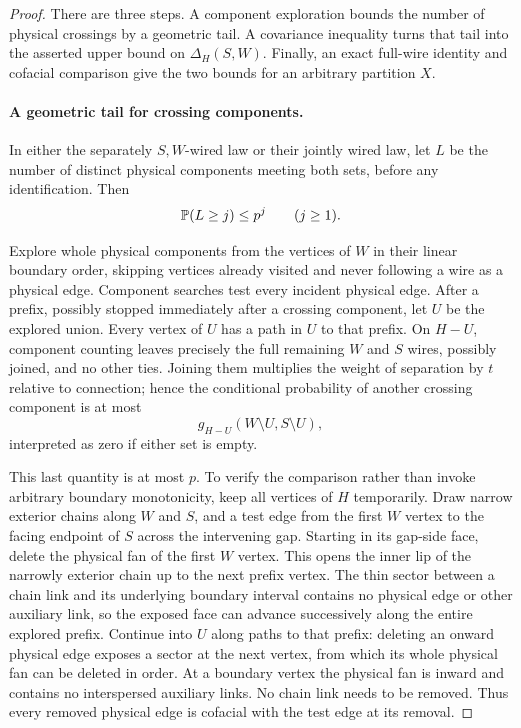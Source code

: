 \begin{proof}
There are three steps. A component exploration bounds the number of
physical crossings by a geometric tail. A covariance inequality turns
that tail into the asserted upper bound on $\Delta_H(S,W)$. Finally,
an exact full-wire identity and cofacial comparison give the two bounds
for an arbitrary partition $X$.

\paragraph{A geometric tail for crossing components.}
In either the separately
$S,W$-wired law or their jointly wired law, let $L$ be the number of
distinct physical components meeting both sets, before any identification.
Then
\begin{equation}
 \mathbb P(L\ge j)\le p^j\qquad(j\ge1).
 \label{rect:component-tail}
\end{equation}

Explore whole physical components from the vertices of $W$ in their
linear boundary order, skipping vertices already visited and never
following a wire as a physical edge.  Component searches test every
incident physical edge.  After a prefix, possibly stopped immediately
after a crossing component, let $U$ be the explored union.  Every
vertex of $U$ has a path in $U$ to that prefix.  On $H-U$, component
counting leaves precisely the full remaining $W$ and $S$ wires,
possibly joined, and no other ties.  Joining them multiplies the
weight of separation by $t$ relative to connection; hence the
conditional probability of another crossing component is at most
\[
 g_{H-U}(W\setminus U,S\setminus U),
\]
interpreted as zero if either set is empty.

This last quantity is at most $p$.  To verify the comparison rather
than invoke arbitrary boundary monotonicity, keep all vertices of $H$
temporarily.  Draw narrow exterior chains along $W$ and $S$, and a
test edge from the first $W$ vertex to the facing endpoint of $S$
across the intervening gap.  Starting in its gap-side face, delete
the physical fan of the first $W$ vertex.  This opens the inner lip
of the narrowly exterior chain up to the next prefix vertex.  The
thin sector between a chain link and its underlying boundary interval
contains no physical edge or other auxiliary link, so the exposed
face can advance successively along the entire explored prefix.
Continue into $U$ along paths to that prefix: deleting an onward
physical edge exposes a sector at the next vertex, from which its
whole physical fan can be deleted in order.  At a boundary vertex
the physical fan is inward and contains no interspersed auxiliary
links.  No chain link needs to be removed.  Thus every removed
physical edge is cofacial with the test edge at its removal.


\end{proof}
